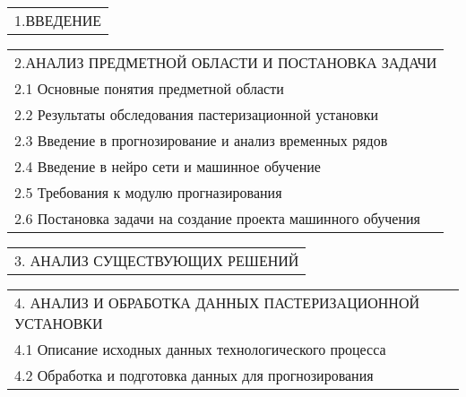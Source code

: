 \documentclass[12pt, А4]{article} %
\begin{document}
\begin{FlushLeft}
    \begin{tabular}{p{17.25cm}} %
        \textsf{1.ВВЕДЕНИЕ} \vspace{1pt} \hline \\
    \end{tabular} %

    \begin{tabular}{p{17.25cm}} %
        \textsf{2.АНАЛИЗ ПРЕДМЕТНОЙ ОБЛАСТИ И ПОСТАНОВКА ЗАДАЧИ} \vspace{1pt} \hline \\
        \hspace{0.5cm}\textsf{2.1 Основные понятия предметной области} \vspace{1pt} \hline \\
        \hspace{0.5cm}\textsf{2.2 Результаты обследования пастеризационной установки} \vspace{1pt} \hline \\
        \hspace{0.5cm}\textsf{2.3 Введение в прогнозирование и анализ временных рядов} \vspace{1pt} \hline \\
        \hspace{0.5cm}\textsf{2.4 Введение в нейро сети и машинное обучение} \vspace{1pt} \hline \\
        \hspace{0.5cm}\textsf{2.5 Требования к модулю прогназирования} \vspace{1pt} \hline \\
        \hspace{0.5cm}\textsf{2.6 Постановка задачи на создание проекта машинного обучения} \vspace{1pt} \hline \\
    \end{tabular} %

    \begin{tabular}{p{17.25cm}} %
        \textsf{3. АНАЛИЗ СУЩЕСТВУЮЩИХ РЕШЕНИЙ} \vspace{1pt} \hline \\
    \end{tabular} %

    \begin{tabular}{p{17.25cm}} %
        \textsf{4. АНАЛИЗ И ОБРАБОТКА ДАННЫХ ПАСТЕРИЗАЦИОННОЙ УСТАНОВКИ} \vspace{1pt} \hline \\
        \hspace{0.5cm}\textsf{4.1 Описание исходных данных технологического процесса} \vspace{1pt} \hline \\
        \hspace{0.5cm}\textsf{4.2 Обработка и подготовка данных для прогнозирования} \vspace{1pt} \hline \\
    \end{tabular} %


\end{FlushLeft}
\end{document}
